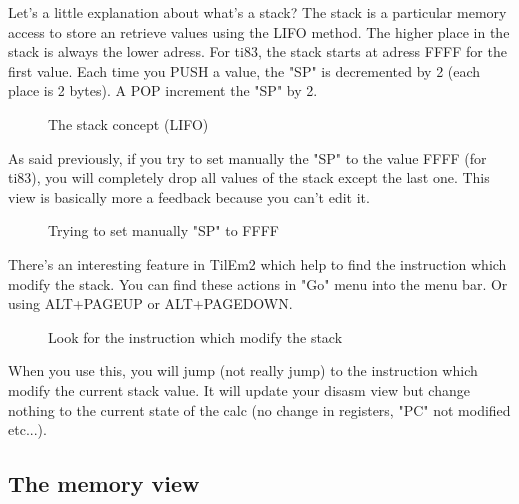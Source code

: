 \documentclass[10pt]{report}
\begin{document}
Let's a little explanation about what's a stack?\newline
The stack is a particular memory access to store an retrieve values using the LIFO method.\newline
The higher place in the stack is always the lower adress.\newline
For ti83, the stack starts at adress FFFF for the first value.\newline
Each time you PUSH a value, the "SP" is decremented by 2 (each place is 2 bytes).\newline
A POP increment the "SP" by 2.\newline
\begin{figure}[H]
\centering
{}
\caption{The stack concept (LIFO)}
\end{figure}


As said previously, if you try to set manually the "SP" to the value FFFF (for ti83), you will completely drop all values of the stack except the last one.\newline
This view is basically more a feedback because you can't edit it. 
\begin{figure}[H]
\centering
{}
\caption{Trying to set manually "SP" to FFFF}
\end{figure}

There's an interesting feature in TilEm2 which help to find the instruction which modify the stack.\newline
You can find these actions in "Go" menu into the menu bar.\newline
Or using ALT+PAGEUP or ALT+PAGEDOWN.\newline
\begin{figure}[H]
\centering
{}
\caption{Look for the instruction which modify the stack}
\end{figure}

When you use this, you will jump (not really jump) to the instruction which modify the current stack value.\newline
It will update your disasm view but change nothing to the current state of the calc (no change in registers, "PC" not modified etc...).\newline

\subsection{The memory view}
\end{document}
